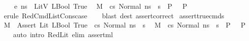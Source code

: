 \begin{isabellebody}
\ \ {\isasymLambda}{\isacharcomma}{\kern0pt}{\isasymGamma}{\isacharcomma}{\kern0pt}{\isasymDelta}\ {\isasymturnstile}\ {\isasymlangle}e{\isacharcomma}{\kern0pt}\ ns{\isasymrangle}\ {\isasymDown}\ LitV\ {\isacharparenleft}{\kern0pt}LBool\ True{\isacharparenright}{\kern0pt}{\isacharsemicolon}{\kern0pt}\isanewline
\ \ M{\isacharcomma}{\kern0pt}{\isasymLambda}{\isacharcomma}{\kern0pt}{\isasymGamma}{\isacharcomma}{\kern0pt}{\isasymDelta}\ {\isasymturnstile}\ {\isasymlangle}cs{\isacharcomma}{\kern0pt}\ Normal\ ns{\isasymrangle}\ {\isacharbrackleft}{\kern0pt}{\isasymrightarrow}{\isacharbrackright}{\kern0pt}\ s{\isacharprime}{\kern0pt}\ {\isasymLongrightarrow}\ P\ {\isasymrbrakk}\ {\isasymLongrightarrow}\ P{\isachardoublequoteclose}\isanewline
%
\isadelimproof
\ \ %
\endisadelimproof
%
\isatagproof
{}\isamarkupfalse%
\ {\isacharparenleft}{\kern0pt}erule\ RedCmdListCons{\isacharunderscore}{\kern0pt}case{\isacharparenright}{\kern0pt}\isanewline
\ \ \isamarkupfalse%
\ {\isacharparenleft}{\kern0pt}blast\ dest{\isacharcolon}{\kern0pt}\ assert{\isacharunderscore}{\kern0pt}correct{\isacharparenright}{\kern0pt}%
\endisatagproof
{\isafoldproof}%
%
\isadelimproof
\isanewline
%
\endisadelimproof
\isanewline
{}\isamarkupfalse%
\ assert{\isacharunderscore}{\kern0pt}true{\isacharunderscore}{\kern0pt}cmds{\isacharcolon}{\kern0pt}\ \isanewline
{\isachardoublequoteopen}{\isasymlbrakk}\ M{\isacharcomma}{\kern0pt}{\isasymLambda}{\isacharcomma}{\kern0pt}{\isasymGamma}{\isacharcomma}{\kern0pt}{\isasymDelta}\ {\isasymturnstile}\ {\isasymlangle}{\isacharparenleft}{\kern0pt}Assert\ {\isacharparenleft}{\kern0pt}Lit\ {\isacharparenleft}{\kern0pt}LBool\ True{\isacharparenright}{\kern0pt}{\isacharparenright}{\kern0pt}{\isacharparenright}{\kern0pt}\ {\isacharhash}{\kern0pt}\ cs{\isacharcomma}{\kern0pt}\ Normal\ ns{\isasymrangle}\ {\isacharbrackleft}{\kern0pt}{\isasymrightarrow}{\isacharbrackright}{\kern0pt}\ s{\isacharprime}{\kern0pt}{\isacharsemicolon}{\kern0pt}\isanewline
\ \ M{\isacharcomma}{\kern0pt}{\isasymLambda}{\isacharcomma}{\kern0pt}{\isasymGamma}{\isacharcomma}{\kern0pt}{\isasymDelta}\ {\isasymturnstile}\ {\isasymlangle}cs{\isacharcomma}{\kern0pt}\ Normal\ ns{\isasymrangle}\ {\isacharbrackleft}{\kern0pt}{\isasymrightarrow}{\isacharbrackright}{\kern0pt}\ s{\isacharprime}{\kern0pt}\ {\isasymLongrightarrow}\ P\ {\isasymrbrakk}\ {\isasymLongrightarrow}\ P{\isachardoublequoteclose}\isanewline
%
\isadelimproof
\ \ %
\endisadelimproof
%
\isatagproof
{}\isamarkupfalse%
\ {\isacharparenleft}{\kern0pt}auto\ intro{\isacharcolon}{\kern0pt}\ RedLit\ elim{\isacharcolon}{\kern0pt}\ assert{\isacharunderscore}{\kern0pt}ml{\isacharparenright}{\kern0pt}%

\end{isabellebody}
